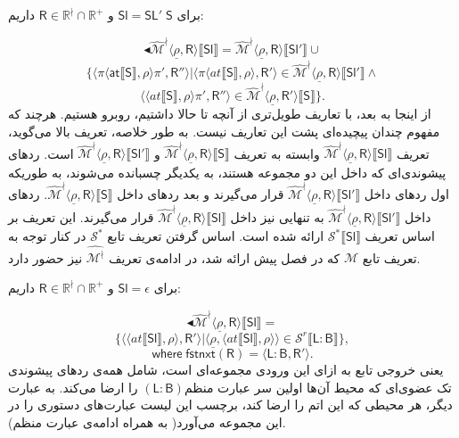 برای $\mathsf{Sl=SL' \; S}$ و $\mathsf{R} \in \mathbb{R^\nmid} \cap \mathbb{R^+}$ داریم:

$$\blacktriangleleft\mathcal{\hat{M}^\nmid} \langle \underline{\rho}, \mathsf{R} \rangle \llbracket \mathsf{Sl} \rrbracket
=
\mathcal{\hat{M}^\nmid} \langle \underline{\rho}, \mathsf{R} \rangle \llbracket \mathsf{Sl'} \rrbracket
\cup$$ 
$$\{ \langle \pi \langle \mathsf{at}\llbracket \mathsf{S} \rrbracket, \rho \rangle \pi'
, \mathsf{R''} \rangle | \langle \pi \langle at \llbracket \mathsf{S}\rrbracket, \rho \rangle, \mathsf{R'} \rangle \in \mathcal{\hat{M}^\nmid}  \langle \underline{\rho} , \mathsf{R} \rangle \llbracket \mathsf{Sl'} \rrbracket\land$$
 $$\langle \langle at \llbracket \mathsf{S}\rrbracket , \rho \rangle \pi' , \mathsf{R''} \rangle \in \mathcal{\hat{M}^\nmid}
\langle \underline{\rho},\mathsf{R'} \rangle   \llbracket \mathsf{S} \rrbracket
 \}.$$
از اینجا به بعد، با تعاریف طویل‌تری از آنچه تا حالا داشتیم، روبرو هستیم. هرچند که مفهوم چندان پیچیده‌ای پشت این تعاریف نیست. به ‌طور خلاصه، تعریف بالا می‌گوید، تعریف 
$\mathcal{\hat{M}^\nmid} \langle \underline{\rho}, \mathsf{R} \rangle \llbracket \mathsf{Sl} \rrbracket$
وابسته به تعریف 
$\mathcal{\hat{M}^\nmid} \langle \underline{\rho}, \mathsf{R} \rangle \llbracket \mathsf{S} \rrbracket$
و
$\mathcal{\hat{M}^\nmid} \langle \underline{\rho}, \mathsf{R} \rangle \llbracket \mathsf{Sl'} \rrbracket$
است. ردهای پیشوندی‌ای که داخل این دو مجموعه هستند، به یکدیگر چسبانده می‌شوند، به‌ طوریکه اول ردهای داخل 
$\mathcal{\hat{M}^\nmid} \langle \underline{\rho}, \mathsf{R} \rangle \llbracket \mathsf{Sl'} \rrbracket$
قرار می‌گیرند و بعد ردهای داخل 
$\mathcal{\hat{M}^\nmid} \langle \underline{\rho}, \mathsf{R} \rangle \llbracket \mathsf{S} \rrbracket$.
ردهای داخل 
$\mathcal{\hat{M}^\nmid} \langle \underline{\rho}, \mathsf{R} \rangle \llbracket \mathsf{Sl'} \rrbracket$
به تنهایی نیز داخل 
$\mathcal{\hat{M}^\nmid} \langle \underline{\rho}, \mathsf{R} \rangle \llbracket \mathsf{Sl} \rrbracket$
قرار می‌گیرند. این تعریف بر اساس تعریف 
$\mathcal{S}^* \llbracket \mathsf{Sl} \rrbracket$
ارائه شده است. اساس گرفتن تعریف تابع 
$\mathcal{S}^*$
در کنار توجه به تعریف تابع 
$\mathcal{M}$
که در فصل پیش ارائه شد، در ادامه‌ی تعریف 
$\mathcal{\hat{M^\nmid}}$
	 نیز حضور دارد.

برای $\mathsf{Sl=\epsilon}$ و $\mathsf{R} \in \mathbb{R^\nmid} \cap \mathbb{R^+}$ داریم:

$$\blacktriangleleft\mathcal{\hat{M}^\nmid} \langle \underline{\rho}, \mathsf{R} \rangle \llbracket \mathsf{Sl} \rrbracket
=$$
$$\{ \langle \langle at \llbracket \mathsf{Sl} \rrbracket , \rho \rangle , \mathsf{R'} \rangle | \langle \underline{\rho} , \langle at \llbracket \mathsf{Sl} \rrbracket, \rho \rangle \rangle \in \mathcal{S}^r \llbracket \mathsf{L:B} \rrbracket
\},$$
$$\mathsf{where \; fstnxt(R)=\langle L:B,R' \rangle}.$$
یعنی خروجی تابع به ازای این ورودی مجموعه‌ای است، شامل همه‌ی ردهای پیشوندی تک عضوی‌ای که محیط آن‌ها اولین سر عبارت منظم$(\mathsf{L:B})$ را ارضا می‌کند. به عبارت دیگر، هر محیطی که این اتم را ارضا کند، برچسب این لیست عبارت‌های دستوری را در این مجموعه می‌آورد( به همراه ادامه‌ی عبارت منظم).


